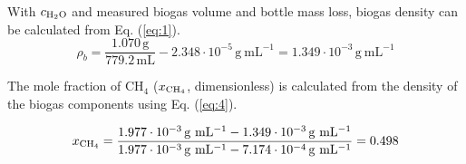 \documentclass[]{article}
\newcommand{\unit}[1]{\ensuremath{\, \mathrm{#1}}}
\begin{document}
With $c\textsubscript{H$_2$O}$ and measured biogas volume and bottle mass loss, biogas density can be calculated from Eq. (\ref{eq:1}).
\begin{equation*}
  \rho_b=\frac{1.070 \unit{g}}{779.2 \unit{mL}} - 2.348 \cdot 10^{-5} \unit{g~mL^{-1}} = 1.349 \cdot 10^{-3} \unit{g~mL^{-1}}
\end{equation*}

The mole fraction of CH$_4$ ($x\textsubscript{CH$_4$}$, dimensionless) is calculated from the density of the biogas components using Eq. (\ref{eq:4}). 

\begin{equation*}
  x\textsubscript{CH$_4$}=\frac{1.977  \cdot 10^{-3} \unit{g~mL^{-1}} - 1.349 \cdot 10^{-3} \unit{g~mL^{-1}}}
  {1.977  \cdot 10^{-3} \unit{g~mL^{-1}} - 7.174 \cdot 10^{-4} \unit{g~mL^{-1}}}
  = 0.498
\end{equation*}




\end{document}
